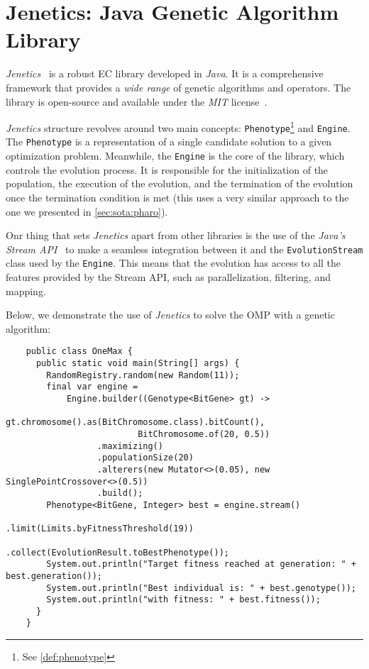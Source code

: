 \section{Jenetics: Java Genetic Algorithm Library}
\label{sec:sota:jenetics}

  \emph{Jenetics}~\autocite{wilhelmstotterJeneticsJavaGenetica} is a robust
  EC library developed in \textit{Java}.
  It is a comprehensive framework that provides a \textit{wide range} of genetic
  algorithms and operators.
  The library is open-source and available under the \textit{MIT} 
  license~\autocite{MITLicense2006}.

  \textit{Jenetics} structure revolves around two main concepts: 
  \texttt{Phenotype}\footnote{See \vref{def:phenotype}} and \texttt{Engine}.
  The \texttt{Phenotype} is a representation of a single candidate solution to
  a given optimization problem.
  Meanwhile, the \texttt{Engine} is the core of the library, which controls the
  evolution process.
  It is responsible for the initialization of the population, the execution of
  the evolution, and the termination of the evolution once the termination
  condition is met (this uses a very similar approach to the one we presented 
  in \vref{sec:sota:pharo}).

  Onr thing that sets \textit{Jenetics} apart from other libraries is the use 
  of the \textit{Java's Stream API}~\autocite{StreamJavaPlatform} to make a 
  seamless integration between it and the \texttt{EvolutionStream} class used 
  by the \texttt{Engine}.
  This means that the evolution has access to all the features provided by the
  Stream API, such as parallelization, filtering, and mapping.

  Below, we demonstrate the use of \textit{Jenetics} to solve the OMP with a 
  genetic algorithm:

  \begin{verbatim}
    public class OneMax {
      public static void main(String[] args) {
        RandomRegistry.random(new Random(11));
        final var engine =
            Engine.builder((Genotype<BitGene> gt) ->
                              gt.chromosome().as(BitChromosome.class).bitCount(),
                          BitChromosome.of(20, 0.5))
                  .maximizing()
                  .populationSize(20)
                  .alterers(new Mutator<>(0.05), new SinglePointCrossover<>(0.5))
                  .build();
        Phenotype<BitGene, Integer> best = engine.stream()
                                                .limit(Limits.byFitnessThreshold(19))
                                                .collect(EvolutionResult.toBestPhenotype());
        System.out.println("Target fitness reached at generation: " + best.generation());
        System.out.println("Best individual is: " + best.genotype());
        System.out.println("with fitness: " + best.fitness());
      }
    }
  \end{verbatim}


